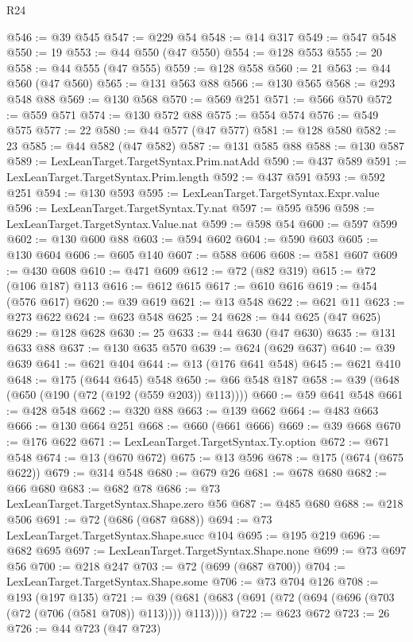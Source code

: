\begin{lexlean}{R24}
\begin{coremodule}
@546 := @39 @545
@547 := @229 @54
@548 := @14 @317
@549 := @547 @548
@550 := 19
@553 := @44 @550 (@47 @550)
@554 := @128 @553
@555 := 20
@558 := @44 @555 (@47 @555)
@559 := @128 @558
@560 := 21
@563 := @44 @560 (@47 @560)
@565 := @131 @563 @88
@566 := @130 @565
@568 := @293 @548 @88
@569 := @130 @568
@570 := @569 @251
@571 := @566 @570
@572 := @559 @571
@574 := @130 @572 @88
@575 := @554 @574
@576 := @549 @575
@577 := 22
@580 := @44 @577 (@47 @577)
@581 := @128 @580
@582 := 23
@585 := @44 @582 (@47 @582)
@587 := @131 @585 @88
@588 := @130 @587
@589 := LexLeanTarget.TargetSyntax.Prim.natAdd
@590 := @437 @589
@591 := LexLeanTarget.TargetSyntax.Prim.length
@592 := @437 @591
@593 := @592 @251
@594 := @130 @593
@595 := LexLeanTarget.TargetSyntax.Expr.value
@596 := LexLeanTarget.TargetSyntax.Ty.nat
@597 := @595 @596
@598 := LexLeanTarget.TargetSyntax.Value.nat
@599 := @598 @54
@600 := @597 @599
@602 := @130 @600 @88
@603 := @594 @602
@604 := @590 @603
@605 := @130 @604
@606 := @605 @140
@607 := @588 @606
@608 := @581 @607
@609 := @430 @608
@610 := @471 @609
@612 := @72 (@82 @319)
@615 := @72 (@106 @187) @113
@616 := @612 @615
@617 := @610 @616
@619 := @454 (@576 @617)
@620 := @39 @619
@621 := @13 @548
@622 := @621 @11
@623 := @273 @622
@624 := @623 @548
@625 := 24
@628 := @44 @625 (@47 @625)
@629 := @128 @628
@630 := 25
@633 := @44 @630 (@47 @630)
@635 := @131 @633 @88
@637 := @130 @635 @570
@639 := @624 (@629 @637)
@640 := @39 @639
@641 := @621 @404
@644 := @13 (@176 @641 @548)
@645 := @621 @410
@648 := @175 (@644 @645) @548
@650 := @66 @548 @187
@658 := @39 (@648 (@650 (@190 (@72 (@192 (@559 @203)) @113))))
@660 := @59 @641 @548
@661 := @428 @548
@662 := @320 @88
@663 := @139 @662
@664 := @483 @663
@666 := @130 @664 @251
@668 := @660 (@661 @666)
@669 := @39 @668
@670 := @176 @622
@671 := LexLeanTarget.TargetSyntax.Ty.option
@672 := @671 @548
@674 := @13 (@670 @672)
@675 := @13 @596
@678 := @175 (@674 (@675 @622))
@679 := @314 @548
@680 := @679 @26
@681 := @678 @680
@682 := @66 @680
@683 := @682 @78
@686 := @73 LexLeanTarget.TargetSyntax.Shape.zero @56
@687 := @485 @680
@688 := @218 @506
@691 := @72 (@686 (@687 @688))
@694 := @73 LexLeanTarget.TargetSyntax.Shape.succ @104
@695 := @195 @219
@696 := @682 @695
@697 := LexLeanTarget.TargetSyntax.Shape.none
@699 := @73 @697 @56
@700 := @218 @247
@703 := @72 (@699 (@687 @700))
@704 := LexLeanTarget.TargetSyntax.Shape.some
@706 := @73 @704 @126
@708 := @193 (@197 @135)
@721 := @39 (@681 (@683 (@691 (@72 (@694 (@696 (@703 (@72 (@706 (@581 @708)) @113)))) @113))))
@722 := @623 @672
@723 := 26
@726 := @44 @723 (@47 @723)

\end{coremodule}
\end{lexlean}
